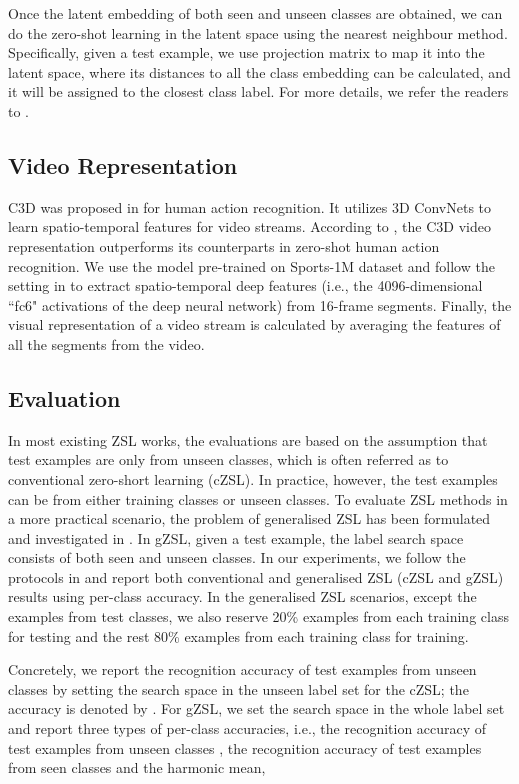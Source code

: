 \documentclass[runningheads,a4paper] {llncs}
\begin{document}
Once the latent embedding of both seen and unseen classes are obtained, we can do the zero-shot learning in the latent space using the nearest neighbour method. Specifically, given a test example, we use projection matrix  to map it into the latent space, where its distances to all the class embedding can be calculated, and it will be assigned to the closest class label. For more details, we refer the readers to \cite{wang2016zero}.

\subsection{Video Representation}
C3D was proposed in \cite{tran2015learning} for human action recognition. It utilizes 3D ConvNets to learn spatio-temporal features for video streams. According to \cite{wang2016zero}, the C3D video representation outperforms its counterparts in zero-shot human action recognition. We use the model pre-trained on Sports-1M dataset and follow the setting in \cite{tran2015learning,wang2016zero} to extract spatio-temporal deep features (i.e., the 4096-dimensional ``fc6" activations of the deep neural network) from 16-frame segments. Finally, the visual representation of a video stream is calculated by averaging the features of all the segments from the video.

\subsection{Evaluation}
\label{sect_eval}

In most existing ZSL works, the evaluations are based on the assumption that test examples are only from unseen classes, which is often referred as to conventional zero-short learning (cZSL). In practice, however, the test examples can be from either training classes or unseen classes. To evaluate ZSL methods in a more practical scenario, the problem of generalised ZSL has been formulated and investigated in \cite{chao2016empirical,xian2017zero}. In gZSL, given a test example, the label search space consists of both seen and unseen classes. In our experiments, we follow the protocols in \cite{xian2017zero} and report both conventional and generalised ZSL (cZSL and gZSL) results using per-class accuracy. In the generalised ZSL scenarios, except the examples from test classes, we also reserve 20\% examples from each training class for testing and the rest 80\% examples from each training class for training. 

Concretely, we report the recognition accuracy of test examples from unseen classes by setting the search space in the unseen label set  for the cZSL; the accuracy is denoted by . For gZSL, we set the search space in the whole label set  and report three types of per-class accuracies, i.e., the recognition accuracy of test examples from unseen classes , the recognition accuracy of test examples from seen classes  and the harmonic mean,
\end{document}
